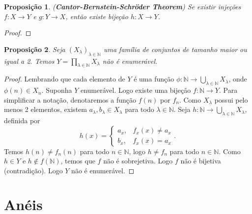 \documentclass{article}
\theoremstyle{plain}
\newtheorem{prop}{Proposição}[section]
\theoremstyle{definition}
\theoremstyle{remark}
\begin{document}
\begin{prop}
	(\textbf{Cantor-Bernstein-Schröder Theorem}) Se existir injeções $f:X\to Y$ e $g: Y \to X$, então existe bijeção $h:X\to Y$.
\end{prop}
\begin{proof}
\end{proof}
\begin{prop}
	Seja $(X_{\lambda})_{\lambda \in \mathbb{N}}$ uma família de conjuntos de tamanho maior ou igual a 2. Temos $Y = \displaystyle\prod_{\lambda \in \mathbb{N}} X_{\lambda}$ não é enumerável.
\end{prop}
\begin{proof}
	Lembrando que cada elemento de $Y$ é uma função $\phi: \mathbb{N} \to\displaystyle\bigcup_{\lambda \in \mathbb{N}} X_{\lambda}$, onde $\phi(n) \in X_n$. Suponha $Y$ enumerável. Logo existe uma bijeção $f: \mathbb{N} \to Y$. Para simplificar a notação, denotaremos a função $f(n)$ por $f_n$.  Como $X_{\lambda}$ possui pelo menos 2 elementos, existem $a_\lambda, b_\lambda \in X_{\lambda}$ para todo $\lambda\in \mathbb{N}$. Seja $h: \mathbb{N} \to \displaystyle\bigcup_{\lambda \in \mathbb{N}} X_{\lambda}$, definida por $$h(x) = \begin{cases} a_x , & f_x(x) \neq a_x\\ b_x, & f_x(x) = a_x \end{cases}.$$
		Temos $h(n) \neq f_n(n)$ para todo $n\in \mathbb{N}$, logo $h \neq f_n$ para todo $n\in \mathbb{N}$. Como $h\in Y$ e $h \not \in f(\mathbb{N})$, temos que $f$ não é sobrejetiva. Logo $f$ não é bijetiva (contradição). Logo $Y$ não é enumerável.
\end{proof}
\section{Anéis }
\end{document}

